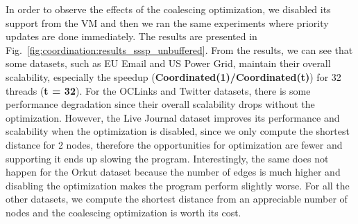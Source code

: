 In order to observe the effects of the coalescing optimization, we disabled its
support from the VM and then we ran the same experiments where priority updates
are done immediately. The results are presented in
Fig.~\ref{fig:coordination:results_sssp_unbuffered}. From the results, we can
see that some datasets, such as EU Email and US Power Grid, maintain their
overall scalability, especially the speedup (\textbf{Coordinated(1)/Coordinated(t)})
for 32 threads (\textbf{t = 32}). For the OCLinks and Twitter datasets, there is
some performance degradation since their overall scalability drops without the
optimization. However, the Live Journal dataset improves its performance and
scalability when the optimization is disabled, since we only compute the
shortest distance for 2 nodes, therefore the opportunities for optimization are
fewer and supporting it ends up slowing the program. Interestingly, the same
does not happen for the Orkut dataset because the number of edges is much higher
and disabling the optimization makes the program perform slightly worse.  For
all the other datasets, we compute the shortest distance from an appreciable
number of nodes and the coalescing optimization is worth its cost.



